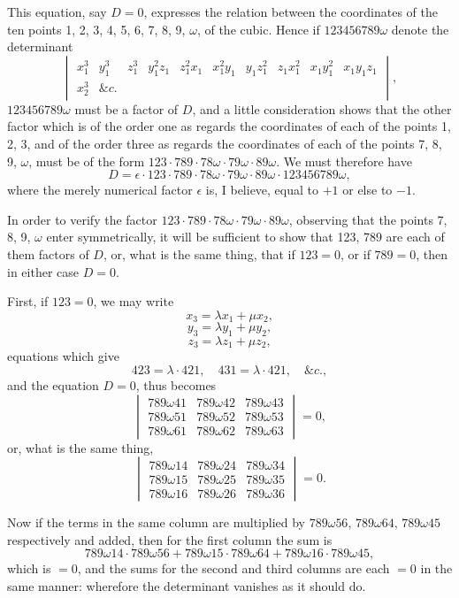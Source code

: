 \documentclass[11pt]{article}
\begin{document}
This equation, say $D=0$, expresses the relation between the coordinates of the ten
points 1, 2, 3, 4, 5, 6, 7, 8, 9, $\omega$, of the cubic. Hence if $123456789\omega$ denote the
determinant
\[ \begin{vmatrix}
x_{1}^{3} & y_{1}^{3} & z_{1}^{3} & y_{1}^{2}z_{1} & z_{1}^{2}x_{1} & x_{1}^{2}y_{1} & y_{1}z_{1}^{2} & z_{1}x_{1}^{2} & x_{1}y_{1}^{2} & x_{1}y_{1}z_{1} \\
x_{2}^{3} & \&c. & & & & & & & &
\end{vmatrix}, \]
$123456789\omega$ must be a factor of $D$, and a little consideration shows that the other
factor which is of the order one as regards the coordinates of each of the points
1, 2, 3, and of the order three as regards the coordinates of each of the points
7, 8, 9, $\omega$, must be of the form $123\cdot 789\cdot 78\omega\cdot 79\omega\cdot 89\omega$. We must therefore have
\[ D = \epsilon\cdot 123\cdot 789\cdot 78\omega\cdot 79\omega\cdot 89\omega\cdot 123456789\omega, \]
where the merely numerical factor $\epsilon$ is, I believe, equal to $+1$ or else to $-1$.

In order to verify the factor $123\cdot 789\cdot 78\omega\cdot 79\omega\cdot 89\omega$, observing that the points
7, 8, 9, $\omega$ enter symmetrically, it will be sufficient to show that 123, 789 are each
of them factors of $D$, or, what is the same thing, that if $123=0$, or if $789=0$, then
in either case $D=0$.

First, if $123=0$, we may write
\[ x_{3}=\lambda x_{1}+\mu x_{2}, \]
\[ y_{3}=\lambda y_{1}+\mu y_{2}, \]
\[ z_{3}=\lambda z_{1}+\mu z_{2}, \]
equations which give
\[ 423=\lambda\cdot 421,\quad 431=\lambda\cdot 421,\quad \&c., \]
and the equation $D=0$, thus becomes
\[ \begin{vmatrix}
789\omega 41 & 789\omega 42 & 789\omega 43 \\
789\omega 51 & 789\omega 52 & 789\omega 53 \\
789\omega 61 & 789\omega 62 & 789\omega 63
\end{vmatrix} = 0, \]
or, what is the same thing,
\[ \begin{vmatrix}
789\omega 14 & 789\omega 24 & 789\omega 34 \\
789\omega 15 & 789\omega 25 & 789\omega 35 \\
789\omega 16 & 789\omega 26 & 789\omega 36
\end{vmatrix} = 0. \]

Now if the terms in the same column are multiplied by $789\omega 56$, $789\omega 64$, $789\omega 45$
respectively and added, then for the first column the sum is
\[ 789\omega 14\cdot 789\omega 56 + 789\omega 15\cdot 789\omega 64 + 789\omega 16\cdot 789\omega 45, \]
which is $=0$, and the sums for the second and third columns are each $=0$ in the
same manner: wherefore the determinant vanishes as it should do.
\end{document}
